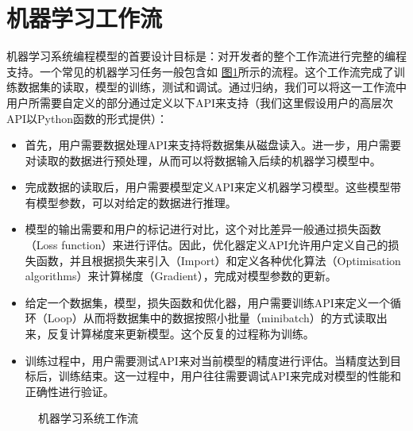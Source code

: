 \documentclass[letterpaper,10pt,english]{sphinxmanual}
\let\sphinxpxdimen\pdfpxdimen\else\newdimen\sphinxpxdimen
\begin{document}
\section{机器学习工作流}
\label{\detokenize{chapter_programming_interface/ml_workflow:id1}}\label{\detokenize{chapter_programming_interface/ml_workflow::doc}}
\sphinxAtStartPar
机器学习系统编程模型的首要设计目标是：对开发者的整个工作流进行完整的编程支持。一个常见的机器学习任务一般包含如
\hyperref[\detokenize{chapter_programming_interface/ml_workflow:img-workflow}]{图\ref{\detokenize{chapter_programming_interface/ml_workflow:img-workflow}}}所示的流程。这个工作流完成了训练数据集的读取，模型的训练，测试和调试。通过归纳，我们可以将这一工作流中用户所需要自定义的部分通过定义以下API来支持（我们这里假设用户的高层次API以Python函数的形式提供）：
\begin{itemize}
\item {} 
\sphinxAtStartPar
{}
首先，用户需要数据处理API来支持将数据集从磁盘读入。进一步，用户需要对读取的数据进行预处理，从而可以将数据输入后续的机器学习模型中。

\item {} 
\sphinxAtStartPar
{}
完成数据的读取后，用户需要模型定义API来定义机器学习模型。这些模型带有模型参数，可以对给定的数据进行推理。

\item {} 
\sphinxAtStartPar
{}
模型的输出需要和用户的标记进行对比，这个对比差异一般通过损失函数（Loss
function）来进行评估。因此，优化器定义API允许用户定义自己的损失函数，并且根据损失来引入（Import）和定义各种优化算法（Optimisation
algorithms）来计算梯度（Gradient），完成对模型参数的更新。

\item {} 
\sphinxAtStartPar
{}
给定一个数据集，模型，损失函数和优化器，用户需要训练API来定义一个循环（Loop）从而将数据集中的数据按照小批量（mini\sphinxhyphen{}batch）的方式读取出来，反复计算梯度来更新模型。这个反复的过程称为训练。

\item {} 
\sphinxAtStartPar
{}
训练过程中，用户需要测试API来对当前模型的精度进行评估。当精度达到目标后，训练结束。这一过程中，用户往往需要调试API来完成对模型的性能和正确性进行验证。

\end{itemize}

\begin{figure}[H]
\centering
\capstart

\noindent\sphinxincludegraphics[width=800\sphinxpxdimen]{{img_workflow}.svg}
\caption{机器学习系统工作流}\label{\detokenize{chapter_programming_interface/ml_workflow:id8}}\label{\detokenize{chapter_programming_interface/ml_workflow:img-workflow}}\end{figure}
\end{document}
